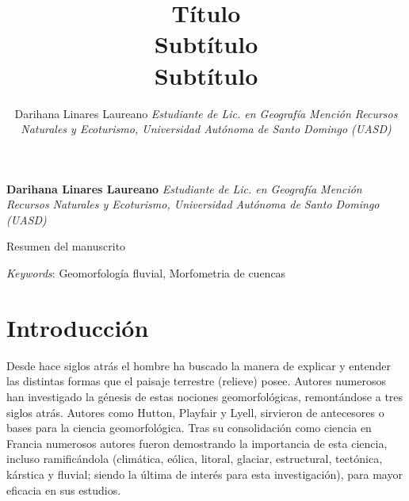 \documentclass[11pt,]{article}
\title{Título\\
Subtítulo\\
Subtítulo  }
\author{\Large Darihana Linares Laureano\vspace{0.05in} \newline\normalsize\emph{Estudiante de Lic. en Geografía Mención Recursos Naturales y Ecoturismo,
Universidad Autónoma de Santo Domingo (UASD)}  }
\date{}
\newcommand*{\authorfont}{\fontfamily{phv}\selectfont}
\renewenvironment{abstract}
 {{%
    \setlength{\leftmargin}{0mm}
    \setlength{\rightmargin}{\leftmargin}%
  }%
  \relax}
 {\endlist}
\begin{document}
	
%

{%
\setlength{\parindent}{0pt}
\thispagestyle{plain}
{\fontsize{18}{20}\selectfont\raggedright 
\maketitle  %

}

{
   \vskip 13.5pt\relax \normalsize\fontsize{11}{12} 
\textbf{\authorfont Darihana Linares Laureano} \hskip 15pt \emph{\small Estudiante de Lic. en Geografía Mención Recursos Naturales y Ecoturismo,
Universidad Autónoma de Santo Domingo (UASD)}   

}

}








\begin{abstract}

    \hbox{\vrule height .2pt width 39.14pc}

    \vskip 8.5pt %

\noindent Resumen del manuscrito


\vskip 8.5pt \noindent \emph{Keywords}: Geomorfología fluvial, Morfometria de cuencas \par

    \hbox{\vrule height .2pt width 39.14pc}



\end{abstract}


\vskip 6.5pt


\noindent  \section{Introducción}\label{introducciuxf3n}

Desde hace siglos atrás el hombre ha buscado la manera de explicar y
entender las distintas formas que el paisaje terrestre (relieve) posee.
Autores numerosos han investigado la génesis de estas nociones
geomorfológicas, remontándose a tres siglos atrás. Autores como Hutton,
Playfair y Lyell, sirvieron de antecesores o bases para la ciencia
geomorfológica. Tras su consolidación como ciencia en Francia numerosos
autores fueron demostrando la importancia de esta ciencia, incluso
ramificándola (climática, eólica, litoral, glaciar, estructural,
tectónica, kárstica y fluvial; siendo la última de interés para esta
investigación), para mayor eficacia en sus estudios.
\end{document}
